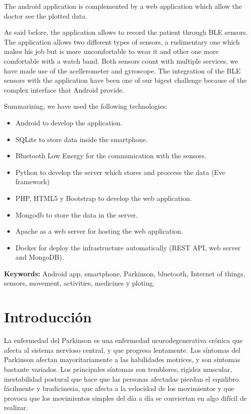 \documentclass[11pt,spanish]{article}
\newcommand\blankpage{%
    \null
    \thispagestyle{empty}%
    \addtocounter{page}{-1}%
    \newpage}
\begin{document}
The android application is complemented by a web application which allow the doctor see the plotted data.
\newline

As said before, the application allows to record the patient through BLE sensors. The application allows two different types of sensors, a rudimentary one which makes his job but is more uncomfortable to wear it and other one more comfortable with a watch band. Both sensors count with multiple services, we have made use of the acellerometer and gyroscope. The integration of the BLE sensors with the application have been one of our bigest challenge because of the complex interface that Android provide.
\newline

Summarizing, we have used the following technologies:

\begin{itemize}
    \item Android to develop the application. 
	\item SQLite to store data inside the smartphone. 
	\item Bluetooth Low Energy for the communication with the sensors. 
	\item Python to develop the server which stores and proccess the data (Eve framework)
    \item PHP, HTML5 y Bootstrap to develop the web application.
	\item Mongodb to store the data in the server.
    \item Apache as a web server for hosting the web application.
    \item Docker for deploy the infrastructure automatically (REST API, web server and MongoDB). 
    \newline
\end{itemize}

{\bf Keywords:} Android app, smartphone, Parkinson, bluetooth, Internet of things, sensors, movement, activities, medicines y ploting.

\newpage
\blankpage


\newpage
\tableofcontents
\newpage
\listoffigures
\newpage
\section{Introducción}

La enfermedad del Parkinson es una enfermedad neurodegenerativa crónica que afecta al sistema nervioso central, y que progresa lentamente. Los síntomas del Parkinson afectan mayoritariamente a las habilidades motrices, y son síntomas bastante variados. Los principales síntomas son temblores, rigidez muscular, inestabilidad postural que hace que las personas afectadas pierdan el equilibro fácilmente y bradicinesia, que afecta a la velocidad de los movimientos y que provoca que los movimientos simples del día a día se conviertan en algo difícil de realizar.
\newline
\end{document}
